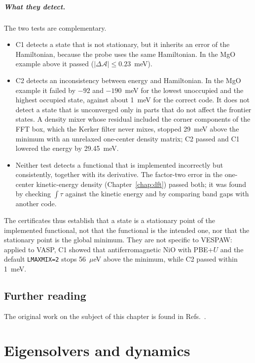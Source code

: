 \documentclass[11pt,a4paper,oneside]{book}
\begin{document}
\paragraph{What they detect.} The two tests are complementary.
\begin{itemize}
\item C1 detects a state that is not stationary, but it inherits an
  error of the Hamiltonian, because the probe uses the same Hamiltonian.
  In the MgO example above it passed ($|\Delta\mathcal A|\le0.23$~meV).
\item C2 detects an inconsistency between energy and Hamiltonian. In the
  MgO example it failed by $-92$ and $-190$~meV for the lowest unoccupied
  and the highest occupied state, against about 1~meV for the correct
  code. It does not detect a state that is unconverged only in parts that
  do not affect the frontier states. A density mixer whose residual
  included the corner components of the FFT box, which the Kerker filter
  never mixes, stopped 29~meV above the minimum with an unrelaxed
  one-center density matrix; C2 passed and C1 lowered the energy by
  29.45~meV.
\item Neither test detects a functional that is implemented incorrectly
  but consistently, together with its derivative. The factor-two error
  in the one-center kinetic-energy density (Chapter~\ref{chap:dft}) passed
  both; it was found by checking $\int\tau$ against the kinetic energy and
  by comparing band gaps with another code.
\end{itemize}
The certificates thus establish that a state is a stationary point of
the implemented functional, not that the functional is the intended one,
nor that the stationary point is the global minimum. They are not
specific to VESPAW: applied to VASP, C1 showed that antiferromagnetic NiO
with PBE+$U$ and the default \texttt{LMAXMIX=2} stops 56~$\mu$eV above
the minimum, while C2 passed within 1~meV.


\section*{Further reading}
The original work on the subject of this chapter is found in
Refs.~\cite{Gonze1996,janak78_prb18_7165,MarzariVanderbiltPayne1997,FreysoldtBoeckNeugebauer2009,VariationalDraft}.

\chapter{Eigensolvers and dynamics}\label{chap:eigensolvers}
\minitoc
\end{document}
